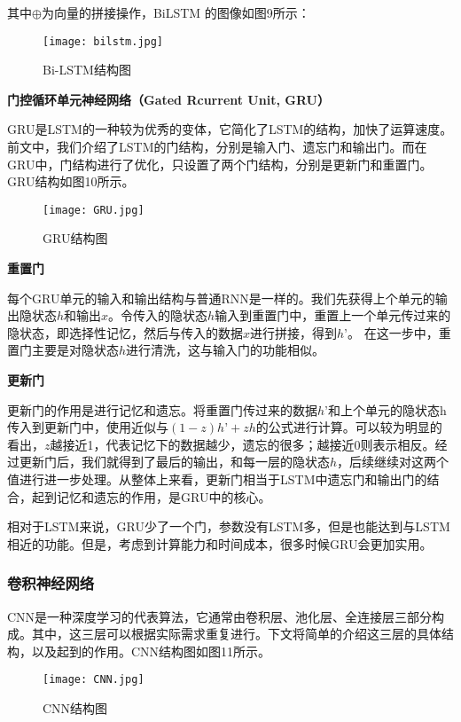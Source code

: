 \documentclass[letterpaper]{article}
\begin{document}
    其中$\oplus$为向量的拼接操作，BiLSTM 的图像如图9所示：
    \begin{figure}[h]
      \centering
      \texttt{[image: bilstm.jpg]}
      \caption{Bi-LSTM结构图}
    \end{figure}

    \textbf{门控循环单元神经网络（Gated Rcurrent Unit, GRU）}

    GRU是LSTM的一种较为优秀的变体，它简化了LSTM的结构，加快了运算速度。前文中，我们介绍了LSTM的门结构，分别是输入门、遗忘门和输出门。而在GRU中，门结构进行了优化，只设置了两个门结构，分别是更新门和重置门。GRU结构如图10所示。
    
    \begin{figure}[h]
      \centering
      \texttt{[image: GRU.jpg]}
      \caption{GRU结构图}
    \end{figure}

    \newpage
    \textbf{重置门}
    
    每个GRU单元的输入和输出结构与普通RNN是一样的。我们先获得上个单元的输出隐状态$h$和输出$x$。令传入的隐状态$h$输入到重置门中，重置上一个单元传过来的隐状态，即选择性记忆，然后与传入的数据$x$进行拼接，得到$h’$。 在这一步中，重置门主要是对隐状态$h$进行清洗，这与输入门的功能相似。
    
    \textbf{更新门}
    
    更新门的作用是进行记忆和遗忘。将重置门传过来的数据$h’$和上个单元的隐状态h传入到更新门中，使用近似与$(1-z)h’+zh$的公式进行计算。可以较为明显的看出，$z$越接近1，代表记忆下的数据越少，遗忘的很多；越接近0则表示相反。经过更新门后，我们就得到了最后的输出，和每一层的隐状态$h$，后续继续对这两个值进行进一步处理。从整体上来看，更新门相当于LSTM中遗忘门和输出门的结合，起到记忆和遗忘的作用，是GRU中的核心。
    
    相对于LSTM来说，GRU少了一个门，参数没有LSTM多，但是也能达到与LSTM相近的功能。但是，考虑到计算能力和时间成本，很多时候GRU会更加实用。

    \subsubsection{卷积神经网络}
    CNN是一种深度学习的代表算法，它通常由卷积层、池化层、全连接层三部分构成。其中，这三层可以根据实际需求重复进行。下文将简单的介绍这三层的具体结构，以及起到的作用。CNN结构图如图11所示。
    
    \begin{figure}[h]
      \centering
      \texttt{[image: CNN.jpg]}
      \caption{CNN结构图}
    \end{figure}
\end{document}
